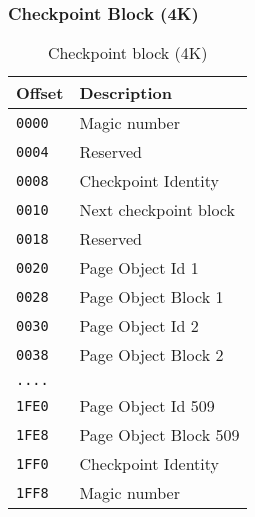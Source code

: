 \subsubsection{Checkpoint Block (4K)}

\begin{table}[ht]
\begin{tabular}{l l}
\hline\hline
Offset &  Description \\
\hline
{\tt 0000} & Magic number \\
{\tt 0004} & Reserved \\
{\tt 0008} & Checkpoint Identity \\
{\tt 0010} & Next checkpoint block \\
{\tt 0018} & Reserved \\
{\tt 0020} & Page Object Id 1 \\
{\tt 0028} & Page Object Block 1 \\
{\tt 0030} & Page Object Id 2 \\
{\tt 0038} & Page Object Block 2 \\
{\tt ....} & \\
{\tt 1FE0} & Page Object Id 509 \\
{\tt 1FE8} & Page Object Block 509 \\
{\tt 1FF0} & Checkpoint Identity \\
{\tt 1FF8} & Magic number \\
\hline
\end{tabular}
\caption{Checkpoint block (4K)}
\label{table:checkpoint-block-4k}
\end{table}

